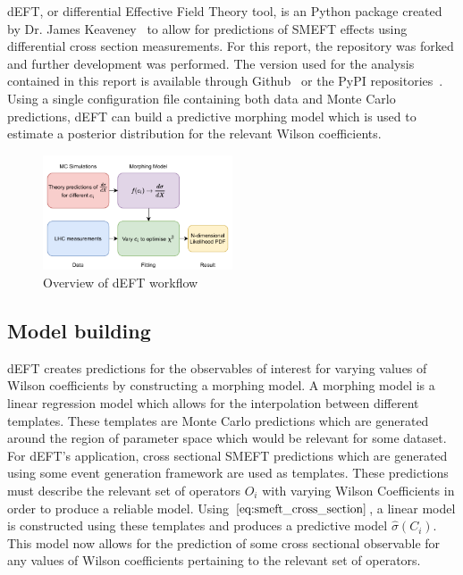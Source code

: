\documentclass[a4paper,11pt]{article}
\begin{document}
dEFT, or differential Effective Field Theory tool, is an Python package created by Dr. James Keaveney~\cite{Keaveney_dEFT} to allow for predictions of SMEFT effects using differential cross section measurements.
For this report, the repository was forked and further development was performed.
The version used for the analysis contained in this report is available through Github~\cite{codecalec_dEFT} or the PyPI repositories~\cite{pypi_dEFT}.
Using a single configuration file containing both data and Monte Carlo predictions, dEFT can build a predictive morphing model which is used to estimate a posterior distribution for the relevant Wilson coefficients.

\begin{figure}[htb]
    \centering
    \includegraphics[width=0.5\textwidth]{images/deft-workflow.pdf}
    \caption{Overview of dEFT workflow}
\end{figure}

\subsection{Model building}
dEFT creates predictions for the observables of interest for varying values of Wilson coefficients by constructing a morphing model.
A morphing model is a linear regression model which allows for the interpolation between different templates.
These templates are Monte Carlo predictions which are generated around the region of parameter space which would be relevant for some dataset.
For dEFT's application, cross sectional SMEFT predictions which are generated using some event generation framework are used as templates.
These predictions must describe the relevant set of operators $O_{i}$ with varying Wilson Coefficients in order to produce a reliable model.
Using $\ref{eq:smeft_cross_section}$, a linear model is constructed using these templates and produces a predictive model $\hat{\sigma}({C_i})$.
This model now allows for the prediction of some cross sectional observable for any values of Wilson coefficients pertaining to the relevant set of operators.
\end{document}
